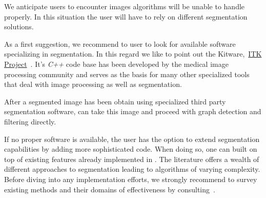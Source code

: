 	We anticipate users to encounter images \NEFIs algorithms will be unable to handle properly. In this situation the user will have to rely on different segmentation solutions. 

	As a first suggestion, we recommend to user to look for available software specializing in segmentation. In this regard we like to point out the Kitware,~\href{http://www.itk.org/itkindex.html}{ITK Project}~\cite{ITKSoftwareGuideThirdEdition}. It's \emph{C++} code base has been developed by the medical image processing community and serves as the basis for many other specialized tools that deal with image processing as well as segmentation. 

	After a segmented image has been obtain using specialized third party segmentation software, \NEFI can take this image and proceed with graph detection and filtering directly.

	If no proper software is available, the user has the option to extend \NEFIs segmentation capabilities by adding more sophisticated code. When doing so, one can built on top of existing features already implemented in \NEFI. The literature offers a wealth of different approaches to segmentation leading to algorithms of varying complexity. Before diving into any implementation efforts, we strongly recommend to survey existing methods and their domains of effectiveness by consulting~\cite{chellappa,Pal19931277,pham2000current}.
